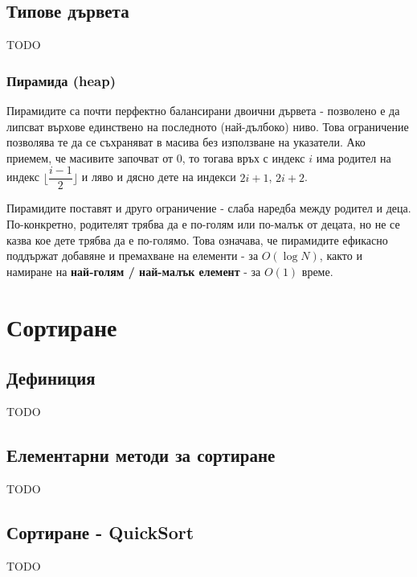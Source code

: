\documentclass[fleqn,12pt]{article}
\begin{document}
\subsection{Типове дървета}
TODO

\subsubsection{Пирамида (heap)}
\label{trees:heap}
Пирамидите са почти перфектно балансирани двоични дървета - позволено е да липсват върхове единствено на последното (най-дълбоко) ниво.
Това ограничение позволява те да се съхраняват в масива без използване на указатели. Ако приемем, че масивите започват от 0, то тогава 
връх с индекс $i$ има родител на индекс $\Bigg\lfloor \dfrac{i - 1}{2} \Bigg\rfloor$ и ляво и дясно дете на индекси $2i + 1$, $2i + 2$.

Пирамидите поставят и друго ограничение - слаба наредба между родител и деца. По-конкретно, родителят трябва да е по-голям или по-малък
от децата, но не се казва кое дете трябва да е по-голямо. Това означава, че пирамидите ефикасно поддържат добавяне и премахване на елементи - за $O(\log N)$,
както и намиране на \textbf{най-голям / най-малък елемент} - за $O(1)$ време.


\section{Сортиране}
\subsection{Дефиниция}
TODO

\subsection{Елементарни методи за сортиране}
TODO

\subsection{Сортиране - QuickSort}
TODO
\end{document}
